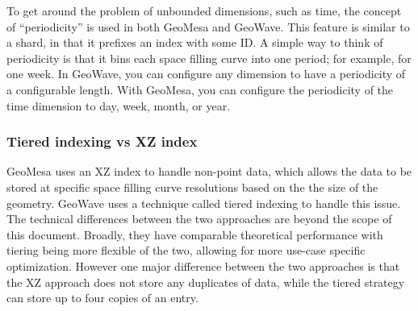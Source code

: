 To get around the problem of unbounded dimensions, such as time, the concept of ``periodicity'' is used in both GeoMesa and GeoWave.
This feature is similar to a shard, in that it prefixes an index with some ID.
A simple way to think of periodicity is that it bins each space filling curve into one period; for example, for one week.
In GeoWave, you can configure any dimension to have a periodicity of a configurable length.
With GeoMesa, you can configure the periodicity of the time dimension to day, week, month, or year.

\subsubsection{Tiered indexing vs XZ index}
\label{sec:featurecompare:indexing:versus}

GeoMesa uses an XZ index to handle non-point data, which allows the data to be stored at specific space filling curve resolutions based on the the size of the geometry.
GeoWave uses a technique called tiered indexing to handle this issue.
The technical differences between the two approaches are beyond the scope of this document.
Broadly, they have comparable theoretical performance with tiering being more flexible of the two, allowing for more use-case specific optimization.
However one major difference between the two approaches is that the XZ approach does not store any duplicates of data, while the tiered strategy can store up to four copies of an entry.
